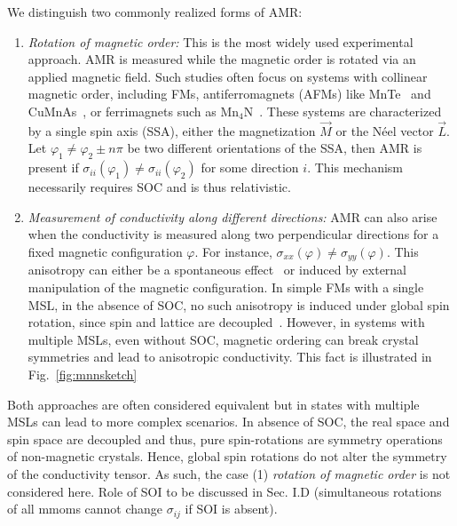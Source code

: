 \documentclass[prb,showpacs,amsmath,amssymb,superscriptaddress,twocolumn,floatfix]{revtex4-1}
\begin{document}
We distinguish two commonly realized forms of AMR:

\begin{enumerate}
	\item \textit{Rotation of magnetic order:} This is the most widely used experimental approach. AMR is measured while the magnetic order is rotated via an applied magnetic field. Such studies often focus on systems with collinear magnetic order, including FMs, antiferromagnets (AFMs) like MnTe~\cite{Kriegner:2017, Gonzalez-Betancourt:2024} and CuMnAs~\cite{Volny:2020, Zubac:2021, Wadley:2016}, or ferrimagnets such as Mn$_4$N~\cite{Kabara:2017}. These systems are characterized by a single spin axis (SSA), either the magnetization $\vec{M}$ or the N\'eel vector $\vec{L}$. Let $\varphi_1 \neq \varphi_2 \pm n\pi$ be two different orientations of the SSA, then AMR is present if {\color{blue} $\sigma_{ii}(\varphi_1) \neq \sigma_{ii}(\varphi_2)$ for some direction $i$}. This mechanism necessarily requires SOC and is thus relativistic.
	
	\item \textit{Measurement of conductivity along different directions:} AMR can also arise when the conductivity is measured along two perpendicular directions for a fixed magnetic configuration $\varphi$. For instance, $\sigma_{xx}(\varphi) \neq \sigma_{yy}(\varphi)$. This anisotropy can either be a spontaneous effect~\cite{Bakonyi:2022} or induced by external manipulation of the magnetic configuration. In {\color{blue} simple FMs with a single MSL}, in the absence of SOC, no such anisotropy is induced under global spin rotation, since spin and lattice are decoupled~\cite{Gonzalez-Hernandez:2024}. However, in systems with multiple MSLs, even without SOC, magnetic ordering can break crystal symmetries and lead to anisotropic conductivity. This fact is illustrated in Fig.~\ref{fig:mnnsketch}
\end{enumerate}

{\color{blue} Both approaches are often considered equivalent but in states with multiple MSLs can lead to more complex scenarios. In absence of SOC, the real space and spin space are decoupled and thus, pure spin-rotations are symmetry operations of non-magnetic crystals. Hence, global spin rotations do not alter the symmetry of the conductivity tensor. As such, the case (1) \textit{rotation of magnetic order} is not considered here.}{\color{red} Role of SOI to be discussed in Sec. I.D (simultaneous rotations of all mmoms cannot change $\sigma_{ij}$ if SOI is absent). }
\end{document}
